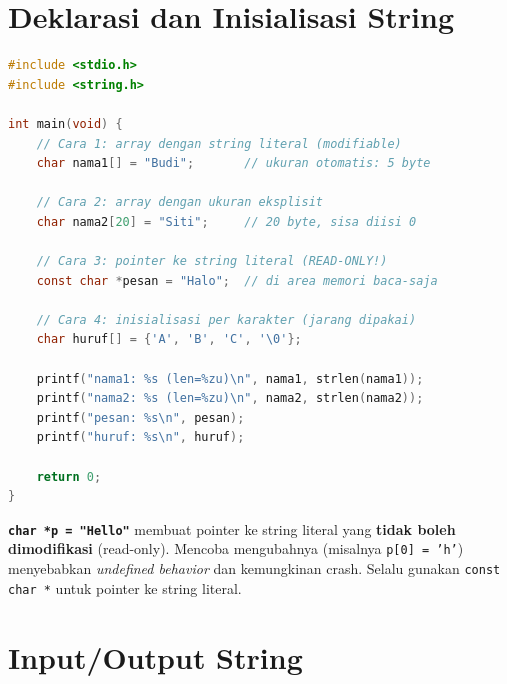 \documentclass[../main.tex]{subfiles}
\begin{document}
\section{Deklarasi dan Inisialisasi String}

\begin{lstlisting}[language=C,caption=Cara mendeklarasikan dan menginisialisasi string]
#include <stdio.h>
#include <string.h>

int main(void) {
    // Cara 1: array dengan string literal (modifiable)
    char nama1[] = "Budi";       // ukuran otomatis: 5 byte
    
    // Cara 2: array dengan ukuran eksplisit
    char nama2[20] = "Siti";     // 20 byte, sisa diisi 0
    
    // Cara 3: pointer ke string literal (READ-ONLY!)
    const char *pesan = "Halo";  // di area memori baca-saja
    
    // Cara 4: inisialisasi per karakter (jarang dipakai)
    char huruf[] = {'A', 'B', 'C', '\0'};
    
    printf("nama1: %s (len=%zu)\n", nama1, strlen(nama1));
    printf("nama2: %s (len=%zu)\n", nama2, strlen(nama2));
    printf("pesan: %s\n", pesan);
    printf("huruf: %s\n", huruf);
    
    return 0;
}
\end{lstlisting}

\begin{catatan}
\textbf{\texttt{char *p = "Hello"}} membuat pointer ke string literal yang \textbf{tidak boleh dimodifikasi} (read-only). Mencoba mengubahnya (misalnya \texttt{p[0] = 'h'}) menyebabkan \textit{undefined behavior} dan kemungkinan crash. Selalu gunakan \texttt{const char *} untuk pointer ke string literal.
\end{catatan}

\section{Input/Output String}
\end{document}
